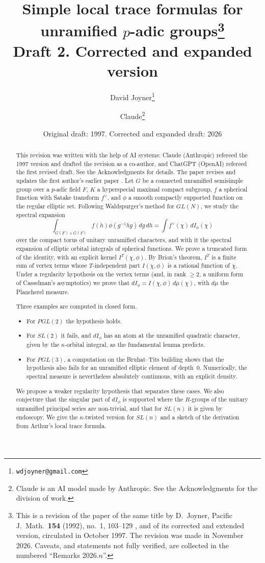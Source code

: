\documentclass[12pt,letterpaper]{article}
\title{Simple local trace formulas for unramified $p$-adic groups\thanks{This is a revision of the paper of the same title by D.~Joyner, Pacific J.\ Math.\ \textbf{154} (1992), no.~1, 103--129 \cite{Jo92}, and of its corrected and extended version, circulated in October 1997. The revision was made in November 2026. Caveats, and statements not fully verified, are collected in the numbered ``Remarks 2026.$n$''.}\\[6pt]
\large Draft 2. Corrected and expanded version}
\author{David Joyner\thanks{\texttt{wdjoyner@gmail.com}} \and
Claude\thanks{Claude is an AI model made by Anthropic. See the Acknowledgments for the division of work.}}
\date{Original draft: 1997. Corrected and expanded draft: 2026}
\numberwithin{equation}{section}
\theoremstyle{plain}
\theoremstyle{remark}
\theoremstyle{plain}
\theoremstyle{definition}
\theoremstyle{remark}
\theoremstyle{remark}
\begin{document}
\maketitle

\begin{abstract}
This revision was written with the help of AI systems: Claude (Anthropic) refereed the 1997 version and drafted the revision as a co-author, and ChatGPT (OpenAI) refereed the first revised draft. See the Acknowledgments for details. The paper revises and updates the first author's earlier paper \cite{Jo92}. Let $G$ be a connected unramified semisimple group over a $p$-adic field $F$, $K$ a hyperspecial maximal compact subgroup, $f$ a spherical function with Satake transform $f^\vee$, and $\phi$ a smooth compactly supported function on the regular elliptic set. Following Waldspurger's method for $GL(N)$, we study the spectral expansion
\[
\int_{G(F)\times G(F)} f(h)\phi(g^{-1}hg)\,dg\,dh=\int f^\vee(\chi)\,dI_\phi(\chi)
\]
over the compact torus of unitary unramified characters, and with it the spectral expansion of elliptic orbital integrals of spherical functions. We prove a truncated form of the identity, with an explicit kernel $I^T(\chi,\phi)$. By Brion's theorem, $I^T$ is a finite sum of vertex terms whose $T$-independent part $I(\chi,\phi)$ is a rational function of $\chi$. Under a regularity hypothesis on the vertex terms (and, in rank $\ge2$, a uniform form of Casselman's asymptotics) we prove that $dI_\phi=I(\chi,\phi)\,d\mu(\chi)$, with $d\mu$ the Plancherel measure.

Three examples are computed in closed form.
\begin{itemize}
\item For $PGL(2)$ the hypothesis holds.
\item For $SL(2)$ it fails, and $dI_\phi$ has an atom at the unramified quadratic character, given by the $\kappa$-orbital integral, as the fundamental lemma predicts.
\item For $PGL(3)$, a computation on the Bruhat--Tits building shows that the hypothesis also fails for an unramified elliptic element of depth~$0$. Numerically, the spectral measure is nevertheless absolutely continuous, with an explicit density.
\end{itemize}
We propose a weaker regularity hypothesis that separates these cases. We also conjecture that the singular part of $dI_\phi$ is supported where the $R$-groups of the unitary unramified principal series are non-trivial, and that for $SL(n)$ it is given by endoscopy. We give the $\kappa$-twisted version for $SL(n)$ and a sketch of the derivation from Arthur's local trace formula.
\end{abstract}
\end{document}
